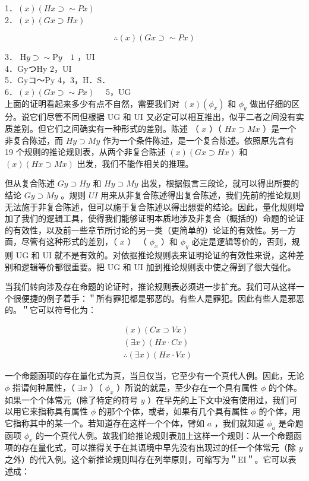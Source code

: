 1．$(x)(H x \supset \sim P x)$\\
2．$(x)(G x \supset H x)$

$$
\therefore(x)(G x \supset \sim P x)
$$

3． $\mathrm{H} y \supset \sim \mathrm{P} y \quad 1$ ，UI\\
4．GyつHy 2，UI\\
5．Gyコ～Py 4，3，H．S．\\

6．$(x)(G x \supset \sim P x) \quad$ 5，UG\\
上面的证明看起来多少有点不自然，需要我们对 $(x)\left(\phi_{x}\right)$ 和 $\phi_{y}$ 做出仔细的区分。说它们尽管不同但根据 UG 和 UI 又必定可以相互推出，似乎二者之间没有实质差别。但它们之间确实有一种形式的差别。陈述 （ $x$ ）（ $H x \supset M x$ ）是一个非复合陈述，而 $H y \supset M y$ 作为一个条件陈述，是一个复合陈述。依照原先含有 19 个规则的推论规则表，从两个非复合陈述 $(x)(G x \supset H x)$ 和 $(x)(H x \supset M x)$ 出发，我们不能作相关的推理。

但从复合陈述 $G y \supset H y$ 和 $H y \supset M y$ 出发，根据假言三段论，就可以得出所要的结论 $G y \supset M y$ 。规则 $U I$ 用来从非复合陈述得出复合陈述，我们先前的推论规则无法施于非复合陈述，但可以施于复合陈述以得出想要的结论。因此，量化规则增加了我们的逻辑工具，使得我们能够证明本质地涉及非复合（概括的）命题的论证的有效性，以及前一些章节所讨论的另一类（更简单的）论证的有效性。另一方面，尽管有这种形式的差别，（ $x$ ） （ $\phi_{x}$ ）和 $\phi_{y}$ 必定是逻辑等价的，否则，规则 UG 和 UI 就不是有效的。对依据推论规则表来证明论证的有效性来说，这种差别和逻辑等价都很重要。把 UG 和 UI 加到推论规则表中使之得到了很大强化。

当我们转向涉及存在命题的论证时，推论规则表必须进一步扩充。我们可从这样一个很便捷的例子着手：＂所有罪犯都是邪恶的。有些人是罪犯。因此有些人是邪恶的。＂它可以符号化为：

$$
\begin{aligned}
& (x)(C x \supset V x) \\
& (\exists x)(H x \cdot C x) \\
& \therefore(\exists x)(H x \cdot V x)
\end{aligned}
$$

一个命题函项的存在量化式为真，当且仅当，它至少有一个真代人例。因此，无论 $\phi$ 指谓何种属性，（ $\exists x$ ）（ $\phi_{x}$ ）所说的就是，至少存在一个具有属性 $\phi$ 的个体。如果一个个体常元（除了特定的符号 $y$ ）在早先的上下文中没有使用过，我们可以用它来指称具有属性 $\phi$ 的那个个体，或者，如果有几个具有属性 $\phi$ 的个体，用它指称其中的某一个。若知道存在这样一个个体，臂如 $a$ ，我们就知道 $\phi_{a}$ 是命题函项 $\phi_{x}$ 的一个真代人例。故我们给推论规则表加上这样一个规则：从一个命题函项的存在量化式，可以推得关于在其语境中早先没有出现过的任一个体常元（除 $y$ 之外）的代入例。这个新推论规则叫存在列举原则，可缩写为＂EI＂。它可以表述成：

